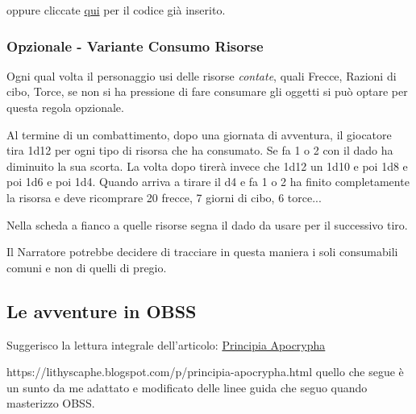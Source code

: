 \begin{multicols}{2}
\medskip


\medskip

oppure cliccate \href{https://anydice.com/program/2610e}{qui} per il codice già inserito.

\subsubsection{Opzionale - Variante Consumo Risorse}\label{varianteconsumorisorse}\hypertarget{varianteconsumorisorse}{}

Ogni qual volta il personaggio usi delle risorse \emph{contate}, quali Frecce, Razioni di cibo, Torce, se non si ha pressione di fare consumare gli oggetti si può optare per questa regola opzionale.

Al termine di un combattimento, dopo una giornata di avventura, il giocatore tira 1d12 per ogni tipo di risorsa che ha consumato. Se fa 1 o 2 con il dado ha diminuito la sua scorta.
La volta dopo tirerà invece che 1d12 un 1d10 e poi 1d8 e poi 1d6 e poi 1d4. Quando arriva a tirare il d4 e fa 1 o 2 ha finito completamente la risorsa e deve ricomprare 20 frecce, 7 giorni di cibo, 6 torce...

Nella scheda a fianco a quelle risorse segna il dado da usare per il successivo tiro.

Il Narratore potrebbe decidere di tracciare in questa maniera i soli consumabili comuni e non di quelli di pregio.

\subsection{Le avventure in OBSS} \hypertarget{OSR}{} \label{avventureinobss}

Suggerisco la lettura integrale dell'articolo: \href{https://lithyscaphe.blogspot.com/p/principia-apocrypha.html} {Principia Apocrypha}

https://lithyscaphe.blogspot.com/p/principia-apocrypha.html quello che segue è un sunto da me adattato e modificato delle linee guida che seguo quando masterizzo OBSS.


\end{multicols}
